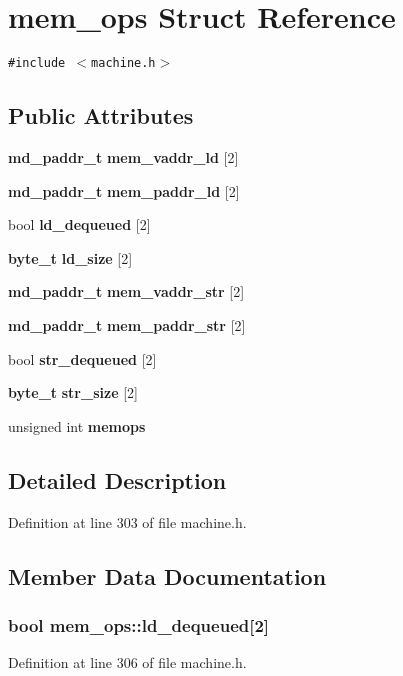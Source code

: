 \section{mem\_\-ops Struct Reference}
\label{structmem__ops}
{\tt \#include $<$machine.h$>$}

\subsection*{Public Attributes}
\begin{CompactItemize}
\item 
{\bf md\_\-paddr\_\-t} {\bf mem\_\-vaddr\_\-ld} [2]
\item 
{\bf md\_\-paddr\_\-t} {\bf mem\_\-paddr\_\-ld} [2]
\item 
bool {\bf ld\_\-dequeued} [2]
\item 
{\bf byte\_\-t} {\bf ld\_\-size} [2]
\item 
{\bf md\_\-paddr\_\-t} {\bf mem\_\-vaddr\_\-str} [2]
\item 
{\bf md\_\-paddr\_\-t} {\bf mem\_\-paddr\_\-str} [2]
\item 
bool {\bf str\_\-dequeued} [2]
\item 
{\bf byte\_\-t} {\bf str\_\-size} [2]
\item 
unsigned int {\bf memops}
\end{CompactItemize}


\subsection{Detailed Description}


Definition at line 303 of file machine.h.

\subsection{Member Data Documentation}
\subsubsection[{ld\_\-dequeued}]{\setlength{\rightskip}{0pt plus 5cm}bool {\bf mem\_\-ops::ld\_\-dequeued}[2]}\label{structmem__ops_4e0149c5502186cc978fc5412d60b087}




Definition at line 306 of file machine.h.

